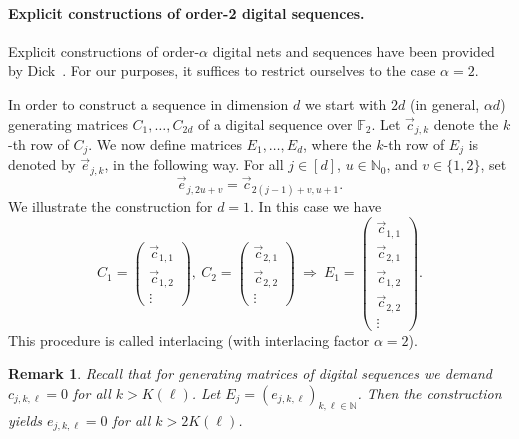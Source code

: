 \documentclass[12pt, a4paper]{article}
\newtheorem{rem}[thm]{Remark}
\newcommand{\N}{{\mathbb{N}}} %
\begin{document}
\paragraph{Explicit constructions of order-2 digital sequences.}%

Explicit constructions of order-$\alpha$ digital nets and sequences have been provided by Dick~\cite{D07,D08}. For our purposes, it suffices to restrict ourselves to the case $\alpha=2$. 

In order to construct a sequence in dimension $d$ we start with $2 d$ (in general, $\alpha d$) generating matrices $C_1, \ldots, C_{2 d}$ of a digital sequence over $\mathbb{F}_2$. Let $\vec{c}_{j,k}$ denote the $k$-th row of $C_j$. We now define matrices $E_1,\ldots, E_d$, where the $k$-th row of $E_j$ is denoted by $\vec{e}_{j,k}$, in the following way. For all $j \in [d]$, $u \in \N_0$, and $v \in \{1,2\}$, set
\begin{equation*}
\vec{e}_{j,2 u + v} = \vec{c}_{2 (j-1) + v, u+1}.
\end{equation*}
We illustrate the construction for $d=1$. In this case we have
\[C_1=\left(\begin{array}{c} 
             \vec{c}_{1,1}\\
             \vec{c}_{1,2}\\
             \vdots 
            \end{array}\right), \ C_2=\left(\begin{array}{c} 
             \vec{c}_{2,1}\\
             \vec{c}_{2,2}\\
             \vdots 
            \end{array}\right) \ \Rightarrow \ 
           E_1=\left(\begin{array}{c} 
             \vec{c}_{1,1}\\
             \vec{c}_{2,1}\\
             \vec{c}_{1,2}\\
             \vec{c}_{2,2}\\
             \vdots 
            \end{array}\right).\]
This procedure is called {interlacing} (with interlacing factor $\alpha=2$).

\begin{rem}\rm
Recall that for generating matrices of digital sequences we demand $c_{j,k,\ell}=0$ for all $k > K(\ell)$. Let $E_j = (e_{j,k,\ell})_{k, \ell \in \mathbb{N}}$. Then the construction yields $e_{j,k,\ell} = 0$ for all $k > 2 K(\ell)$. 
\end{rem}
\end{document}
